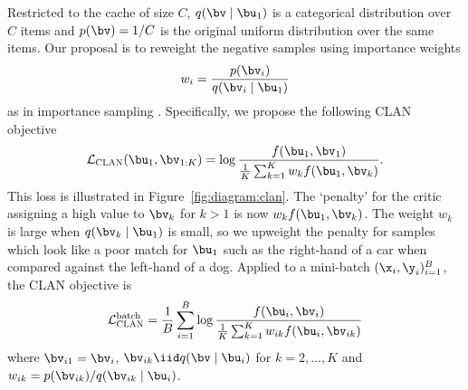
Restricted to the cache of size $C$, $q(\bv\mid\bu_1)$ is a categorical distribution over $C$ items and $p(\bv) = 1/C$ is the original uniform distribution over the same items.
Our proposal is to reweight the negative samples using importance weights
\begin{equation}
w_i = \frac{p(\bv_i)}{q(\bv_i\mid\bu_1)}
\end{equation}
as in importance sampling \cite{kahn1953methods}. 
%
%
%
%
Specifically, we propose the following CLAN objective
\begin{equation}
\label{eq:clan}
\mathcal{L}_\textsc{CLAN}(\bu_1,\bv_{1:K}) = \log \frac{f(\bu_1, \bv_1)}{\frac{1}{K}\sum_{k=1}^K w_k f(\bu_1, \bv_k)}.
\end{equation}
This loss is illustrated in Figure~\ref{fig:diagram:clan}.
The `penalty' for the critic assigning a high value to $\bv_k$ for $k>1$ is now $w_k f(\bu_1, \bv_k)$. The weight $w_k$ is large when $q(\bv_k\mid\bu_1)$ is small, so we upweight the penalty for samples which look like a poor match for $\bu_1$ such as the right-hand of a car when compared against the left-hand of a dog. Applied to a mini-batch $(\x_i,\y_i)_{i=1}^B$, the CLAN objective is
\begin{equation}
\label{eq:clan_batch}
\mathcal{L}_\textsc{CLAN}^\text{batch} = \frac{1}{B}\sum_{i=1}^B \log \frac{f(\bu_i, \bv_i)}{\frac{1}{K}\sum_{k=1}^K w_{ik} f(\bu_i, \bv_{ik})}
\end{equation}
where $\bv_{i1} = \bv_i$,  $\bv_{ik}\iid q(\bv\mid \bu_i)$ for $k=2,...,K$ and $w_{ik} = p(\bv_{ik}) / q(\bv_{ik}\mid \bu_i)$.


